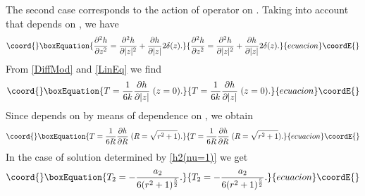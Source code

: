 \documentclass[letterpaper,12pt]{article}
\begin{document}
The second case corresponds to the action of \coordHE{} operator on \coordHE{}. Taking into account that \coordHE{} depends on
\coordHE{}, we have
\begin{equation}\coord{}\boxEquation{
\label{DiffMod} \frac{\partial^2 h}{\partial z^2}=\frac{\partial^2
h}{\partial |z|^2}+\frac{\partial h}{\partial |z|}2\delta(z).
}{
\frac{\partial^2 h}{\partial z^2}=\frac{\partial^2
h}{\partial |z|^2}+\frac{\partial h}{\partial |z|}2\delta(z).
}{ecuacion}\coordE{}\end{equation}
From \eqref{DiffMod} and \eqref{LinEq} we find \coordHE{}
\begin{equation}\coord{}\boxEquation{
\label{TFromZ} T=\frac{1}{6k}\frac{\partial h}{\partial
|z|}\;(z=0).
}{
T=\frac{1}{6k}\frac{\partial h}{\partial
|z|}\;(z=0).
}{ecuacion}\coordE{}\end{equation}
Since  \coordHE{} depends on \coordHE{} by means of dependence on \coordHE{}, we obtain
\begin{equation}\coord{}\boxEquation{
\label{TFromR} T=\frac{1}{6R}\frac{\partial h}{\partial
R}\;(R=\sqrt{r^2+1}).
}{
T=\frac{1}{6R}\frac{\partial h}{\partial
R}\;(R=\sqrt{r^2+1}).
}{ecuacion}\coordE{}\end{equation}
In the case of solution \coordHE{} determined by \eqref{h2(nu=1)} we
get
\begin{equation}\coord{}\boxEquation{
\label{T_2} T_2=-\frac{a_2}{6(r^2+1)^{\frac{5}{2}}}.
}{
T_2=-\frac{a_2}{6(r^2+1)^{\frac{5}{2}}}.
}{ecuacion}\coordE{}\end{equation}
\end{document}
